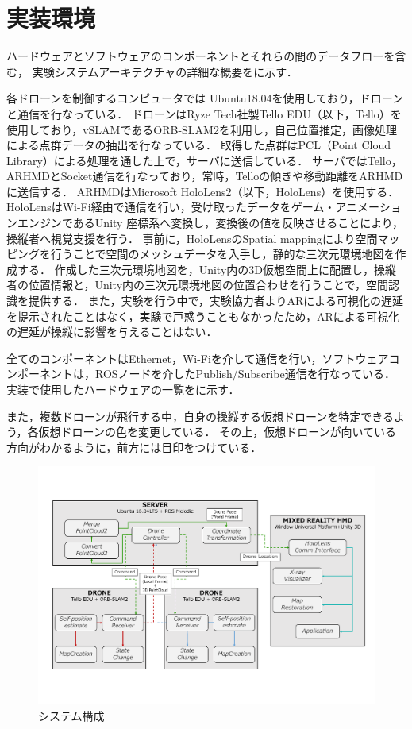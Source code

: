 \documentclass[a4paper,11pt]{ujreport}
\begin{document}
\section{実装環境}
\label{sec:DevEnviroment}

ハードウェアとソフトウェアのコンポーネントとそれらの間のデータフローを含む，
実験システムアーキテクチャの詳細な概要をに示す．

各ドローンを制御するコンピュータでは Ubuntu18.04を使用しており，ドローンと通信を行なっている．
ドローンはRyze Tech社製Tello EDU（以下，Tello）\cite{web-tello}を使用しており，vSLAMであるORB-SLAM2\cite{article-slam}を利用し，自己位置推定，画像処理による点群データの抽出を行なっている．
取得した点群はPCL（Point Cloud Library）\cite{book-pcl}による処理を通した上で，サーバに送信している．
サーバではTello，ARHMDとSocket通信を行なっており，常時，Telloの傾きや移動距離をARHMDに送信する．
ARHMDはMicrosoft HoloLens2（以下，HoloLens）\cite{web-hololens}を使用する．
HoloLensはWi-Fi経由で通信を行い，受け取ったデータをゲーム・アニメーションエンジンであるUnity \cite{web-unity}座標系へ変換し，変換後の値を反映させることにより，操縦者へ視覚支援を行う．
事前に，HoloLensのSpatial mapping\cite{web-spatial}により空間マッピングを行うことで空間のメッシュデータを入手し，静的な三次元環境地図を作成する．
作成した三次元環境地図を，Unity内の3D仮想空間上に配置し，操縦者の位置情報と，Unity内の三次元環境地図の位置合わせを行うことで，空間認識を提供する．
また，実験を行う中で，実験協力者よりARによる可視化の遅延を提示されたことはなく，実験で戸惑うこともなかったため，ARによる可視化の遅延が操縦に影響を与えることはない．

全てのコンポーネントはEthernet，Wi-Fiを介して通信を行い，ソフトウェアコンポーネントは，ROSノード\cite{ros}を介したPublish/Subscribe通信を行なっている．
実装で使用したハードウェアの一覧をに示す．

また，複数ドローンが飛行する中，自身の操縦する仮想ドローンを特定できるよう，各仮想ドローンの色を変更している．
その上，仮想ドローンが向いている方向がわかるように，前方には目印をつけている．

\begin{figure}[!tb]
  \centering
  \includegraphics[width=\linewidth]{img/04_system.pdf}
  \caption{システム構成}
  \label{fig:04_system}
\end{figure}
\end{document}
